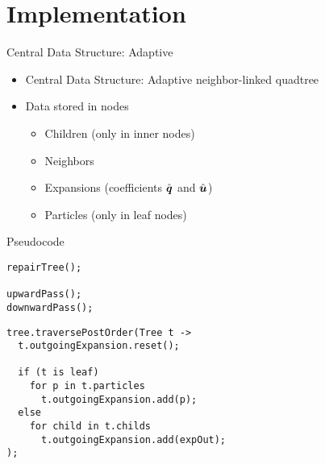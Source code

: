 \section{Implementation}

\begin{frame}[b]{Central Data Structure: Adaptive}
  \vfill
  \begin{itemize}
    \item Central Data Structure: Adaptive neighbor-linked quadtree
    \item Data stored in nodes
    \begin{itemize}
      \item Children (only in inner nodes)
      \item Neighbors
      \item Expansions (coefficients $\hat{\boldsymbol{q}}$ and $\hat{\boldsymbol{u}}$)
      \item Particles (only in leaf nodes)
    \end{itemize}
  \end{itemize}

  \vfill
  \begin{figure}
    \centering
  \end{figure}
\end{frame}

\begin{frame}[fragile]{Pseudocode}
  \begin{lstlisting}[caption = Fast Multipole Method]
repairTree();

upwardPass();
downwardPass();
  \end{lstlisting}

  \begin{lstlisting}[caption = Upward Pass]
tree.traversePostOrder(Tree t ->
  t.outgoingExpansion.reset();

  if (t is leaf)
    for p in t.particles
      t.outgoingExpansion.add(p);
  else
    for child in t.childs
      t.outgoingExpansion.add(expOut);
);
  \end{lstlisting}
\end{frame}

